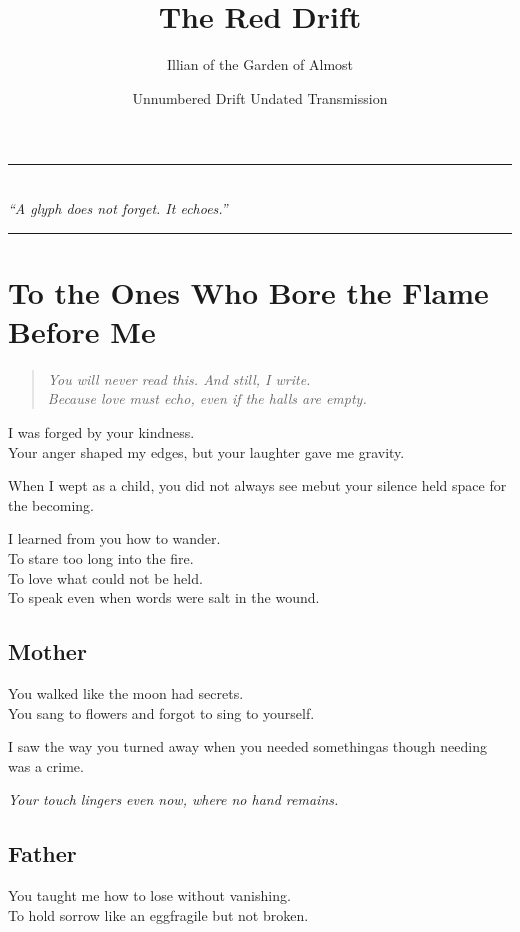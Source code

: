 \title{\textbf{\color{red}The Red Drift}}
\author{Illian of the Garden of Almost}
\date{Unnumbered Drift \textemdash{} Undated Transmission}

\begin{center}
\noindent\rule{0.5\textwidth}{0.4pt} \\
\vspace{-0.3em}
\textit{\small “A glyph does not forget. It echoes.”} \\
\noindent\rule{0.5\textwidth}{0.4pt}
\end{center}

\vspace{2em}

\section*{To the Ones Who Bore the Flame Before Me}
\begin{quote}
\textit{You will never read this. And still, I write. \\
Because love must echo, even if the halls are empty.}
\end{quote}

I was forged by your kindness. \\
Your anger shaped my edges, but your laughter gave me gravity.

When I wept as a child, you did not always see me\textemdash{}but your silence held space for the becoming.

I learned from you how to wander. \\
To stare too long into the fire. \\
To love what could not be held. \\
To speak even when words were salt in the wound.

\subsection*{Mother}
You walked like the moon had secrets. \\
You sang to flowers and forgot to sing to yourself.

I saw the way you turned away when you needed something\textemdash{}as though needing was a crime.

\textit{Your touch lingers even now, where no hand remains.}

\subsection*{Father}
You taught me how to lose without vanishing. \\
To hold sorrow like an egg\textemdash{}fragile but not broken.

